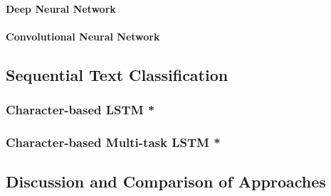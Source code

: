 \paragraph{Deep Neural Network}
\paragraph{Convolutional Neural Network}

\subsection{Sequential Text Classification}

\subsubsection{Character-based LSTM *}

\subsubsection{Character-based Multi-task LSTM *}

\subsection{Discussion and Comparison of Approaches}
